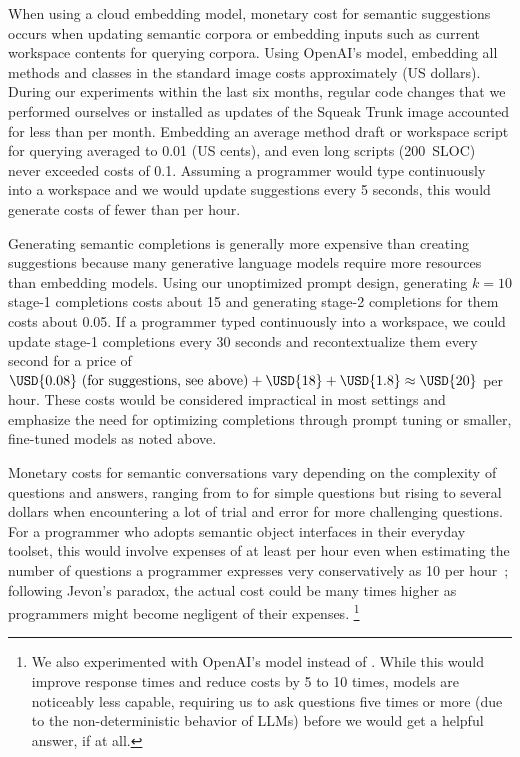 When using a cloud embedding model, monetary cost for semantic suggestions occurs when updating semantic corpora or embedding inputs such as current workspace contents for querying corpora.
Using OpenAI's  model, embedding all methods and classes in the standard image costs approximately  (US dollars).
During our experiments within the last six months, regular code changes that we performed ourselves or installed as updates of the Squeak Trunk image accounted for less than  per month.
Embedding an average method draft or workspace script for querying averaged to \qty{0.01}{\cent} (US cents), and even long scripts (\qty{200}{SLOC}) never exceeded costs of \qty{0.1}{\cent}.
Assuming a programmer would type continuously into a workspace and we would update suggestions every 5 seconds, this would generate costs of fewer than  per hour.

Generating semantic completions is generally more expensive than creating suggestions because many generative language models require more resources than embedding models.
Using our unoptimized prompt design, generating $k = 10$ stage-1 completions costs about \qty{15}{\cent} and generating stage-2 completions for them costs about \qty{0.05}{\cent}.
If a programmer typed continuously into a workspace, we could update stage-1 completions every 30 seconds and recontextualize them every second for a price of $\USD{0.08}\text{ (for suggestions, see above)} + \USD{18} + \USD{1.8} \approx \USD{20}$ per hour.
These costs would be considered impractical in most settings and emphasize the need for optimizing completions through prompt tuning or smaller, fine-tuned models as noted above.

Monetary costs for semantic conversations vary depending on the complexity of questions and answers, ranging from  to  for simple questions but rising to several dollars when encountering a lot of trial and error for more challenging questions.
For a programmer who adopts semantic object interfaces in their everyday toolset, this would involve expenses of at least  per hour even when estimating the number of questions a programmer expresses very conservatively as 10 per hour~\cite{kubelka2018road}; following Jevon's paradox, the actual cost could be many times higher as programmers might become negligent of their expenses.%
\footnote{
	We also experimented with OpenAI's  model instead of .
	While this would improve response times and reduce costs by 5 to 10 times, \gptthreefive models are noticeably less capable, requiring us to ask questions five times or more (due to the non-deterministic behavior of LLMs) before we would get a helpful answer, if at all.
}

